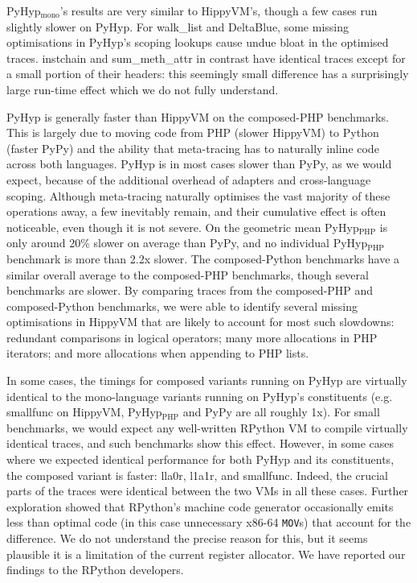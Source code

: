 \documentclass[a4paper,UKenglish]{lipics-v2016}
\newcommand{\ourvm}{PyHyp\xspace}
\newcommand{\hippy}{HippyVM\xspace}
\newcommand{\pypy}{PyPy\xspace}
\newcommand{\ourvmcomp}{PyHyp$_{\textrm{PHP}}$\xspace}
\newcommand{\ourvmmono}{PyHyp$_{\textrm{mono}}$\xspace}
\begin{document}
\ourvmmono's results are very similar to \hippy's, though a few cases run slightly
slower on \ourvm. For walk\_list and DeltaBlue, some missing optimisations
in \ourvm's scoping lookups cause undue bloat in the optimised traces.
instchain and sum\_meth\_attr in contrast have identical traces except
for a small portion of their headers: this seemingly small
difference has a surprisingly large run-time effect which we do not
fully understand.

\ourvm is generally faster than \hippy on the composed-PHP benchmarks. This is largely due to moving code
from PHP (slower \hippy) to Python (faster \pypy) and the ability that
meta-tracing has to naturally inline code across both languages.  \ourvm is
in most cases slower than \pypy, as we would expect, because of the additional
overhead of adapters and cross-language scoping. Although meta-tracing naturally
optimises the vast majority of these operations away, a few inevitably remain,
and their cumulative effect is often noticeable, even though it is not severe.
On the geometric mean \ourvmcomp is only around 20\%{} slower on average than
\pypy, and no individual \ourvmcomp benchmark is more than 2.2x slower. The
composed-Python benchmarks have a similar overall average to the composed-PHP
benchmarks, though several benchmarks are slower. By comparing traces
from the composed-PHP and composed-Python benchmarks, we were able to
identify several missing optimisations in \hippy that are likely to
account for most such slowdowns: redundant
comparisons in logical operators; many more allocations in PHP iterators; and
more allocations when appending to PHP lists.

In some cases, the timings for composed variants running on \ourvm 
are virtually identical to the mono-language variants running on \ourvm's constituents (e.g.
smallfunc on \hippy, \ourvmcomp and \pypy are all roughly 1x).
For small benchmarks, we would expect any well-written RPython VM
to compile virtually identical traces, and such benchmarks
show this effect. However, in some cases where we expected identical
performance for both \ourvm and its constituents, the composed
variant is faster: lla0r, l1a1r, and smallfunc. Indeed, the crucial
parts of the traces were identical between the two VMs in all these cases. Further exploration showed
that RPython's machine code generator occasionally emits less than optimal code
(in this case unnecessary x86-64 \texttt{MOV}s) that account for the difference.
We do not understand the precise reason for this, but it seems plausible it is a
limitation of the current register allocator. We have reported our findings to
the RPython developers.
\end{document}

